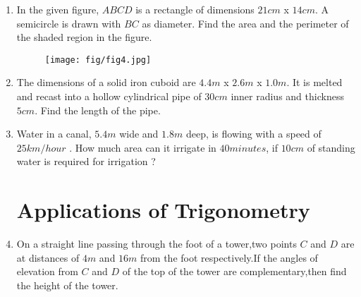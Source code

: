 \documentclass{article}
\begin{document}
\begin{enumerate}
																																																																								     \item In the given figure, $ABCD$ is a rectangle of dimensions $21 cm$ x $14 cm$. A semicircle is drawn with $BC$ as diameter. Find the area and the perimeter of the shaded region in the figure.
																																																																									         \begin{figure}[h]
																																																																											         \centering
																																																																												         \texttt{[image: fig/fig4.jpg]}
																																																																													      \end{figure}

																																																																													          \item The dimensions of a solid iron cuboid are $4.4 m$ x $2.6 m$ x $1.0 m $. It is melted and recast into a hollow cylindrical pipe of $30 cm$ inner radius and thickness $5 cm$. Find the length of the pipe.

																																																																															      
																																																																															      \item Water in a canal, $5.4 m$ wide and $1.8 m$ deep, is flowing with a speed of $25 km/hour$ . How much area can it irrigate in $40 minutes$, if $10 cm$ of standing water is required for irrigation ?
																																																																																          
																																																																																      \section{Applications of Trigonometry}
																																																																																          
																																																																																	      \item On a straight line passing through the foot of a tower,two points $C$ and $D$ are at distances of $4 m$ and $16 m$ from the foot respectively.If the angles of elevation from $C$ and $D$ of the top of the tower are complementary,then find the height of the tower.
																																																																																		          

\end{enumerate}
\end{document}
